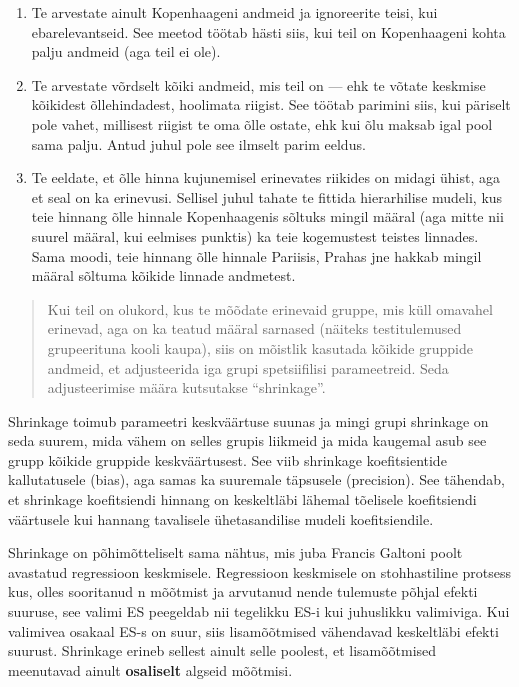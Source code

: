 \documentclass[]{book}
\begin{document}
\begin{enumerate}
\def\labelenumi{\arabic{enumi}.}
\item
  Te arvestate ainult Kopenhaageni andmeid ja ignoreerite teisi, kui ebarelevantseid. See meetod töötab hästi siis, kui teil on Kopenhaageni kohta palju andmeid (aga teil ei ole).
\item
  Te arvestate võrdselt kõiki andmeid, mis teil on --- ehk te võtate keskmise kõikidest õllehindadest, hoolimata riigist. See töötab parimini siis, kui päriselt pole vahet, millisest riigist te oma õlle ostate, ehk kui õlu maksab igal pool sama palju. Antud juhul pole see ilmselt parim eeldus.
\item
  Te eeldate, et õlle hinna kujunemisel erinevates riikides on midagi ühist, aga et seal on ka erinevusi. Sellisel juhul tahate te fittida hierarhilise mudeli, kus teie hinnang õlle hinnale Kopenhaagenis sõltuks mingil määral (aga mitte nii suurel määral, kui eelmises punktis) ka teie kogemustest teistes linnades. Sama moodi, teie hinnang õlle hinnale Pariisis, Prahas jne hakkab mingil määral sõltuma kõikide linnade andmetest.
\end{enumerate}

\begin{quote}
Kui teil on olukord, kus te mõõdate erinevaid gruppe, mis küll omavahel erinevad, aga on ka teatud määral sarnased (näiteks testitulemused grupeerituna kooli kaupa), siis on mõistlik kasutada kõikide gruppide andmeid, et adjusteerida iga grupi spetsiifilisi parameetreid. Seda adjusteerimise määra kutsutakse ``shrinkage''.
\end{quote}

Shrinkage toimub parameetri keskväärtuse suunas ja mingi grupi shrinkage on seda suurem, mida vähem on selles grupis liikmeid ja mida kaugemal asub see grupp kõikide gruppide keskväärtusest. See viib shrinkage koefitsientide kallutatusele (bias), aga samas ka suuremale täpsusele (precision). See tähendab, et shrinkage koefitsiendi hinnang on keskeltläbi lähemal tõelisele koefitsiendi väärtusele kui hannang tavalisele ühetasandilise mudeli koefitsiendile.

Shrinkage on põhimõtteliselt sama nähtus, mis juba Francis Galtoni poolt avastatud regressioon keskmisele.
Regressioon keskmisele on stohhastiline protsess kus, olles sooritanud n mõõtmist ja arvutanud nende tulemuste põhjal efekti suuruse, see valimi ES peegeldab nii tegelikku ES-i kui juhuslikku valimiviga. Kui valimivea osakaal ES-s on suur, siis lisamõõtmised vähendavad keskeltläbi efekti suurust. Shrinkage erineb sellest ainult selle poolest, et lisamõõtmised meenutavad ainult \textbf{osaliselt} algseid mõõtmisi.
\end{document}
